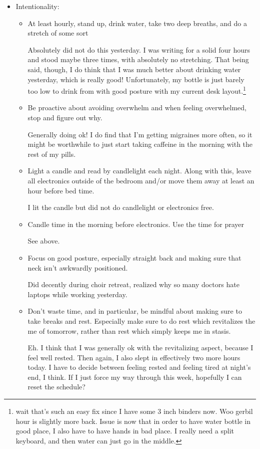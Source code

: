 \documentclass[12pt]{article}[titlepage]
\renewcommand{\,}{\textsuperscript{,}}
\begin{document}
\begin{itemize}   
\item Intentionality:  
\begin{itemize}  
\item At least hourly, stand up, drink water, take two deep breaths, and do a stretch of some sort

Absolutely did not do this yesterday.  
I was writing for a solid four hours and stood maybe three times, with absolutely no stretching.  
That being said, though, I do think that I was much better about drinking water yesterday, which is really good!  
Unfortunately, my bottle is just barely too low to drink from with good posture with my current desk layout.\footnote{wait that's such an easy fix since I have some 3 inch binders now. Woo gerbil hour is slightly more back. Issue is now that in order to have water bottle in good place, I also have to have hands in bad place. I really need a split keyboard, and then water can just go in the middle.}

\item Be proactive about avoiding overwhelm and when feeling overwhelmed, stop and figure out why.

Generally doing ok! I do find that I'm getting migraines more often, so it might be worthwhile to just start taking caffeine in the morning with the rest of my pills.  
\item Light a candle and read by candlelight each night. Along with this, leave all electronics outside of the bedroom and/or move them away at least an hour before bed time.

I lit the candle but did not do candlelight or electronics free.  
\item Candle time in the morning before electronics. Use the time for prayer  
  
See above.  
\item Focus on good posture, especially straight back and making sure that neck isn't awkwardly positioned.

Did decently during choir retreat, realized why so many doctors hate laptops while working yesterday.

\item Don't waste time, and in particular, be mindful about making sure to take breaks and rest. Especially make sure to do rest which revitalizes the me of tomorrow, rather than rest which simply keeps me in stasis.

Eh. I think that I was generally ok with the revitalizing aspect, because I feel well rested.  
Then again, I also slept in effectively two more hours today.  
I have to decide between feeling rested and feeling tired at night's end, I think.  
If I just force my way through this week, hopefully I can reset the schedule?


\end{itemize}
\end{itemize}
\end{document}
